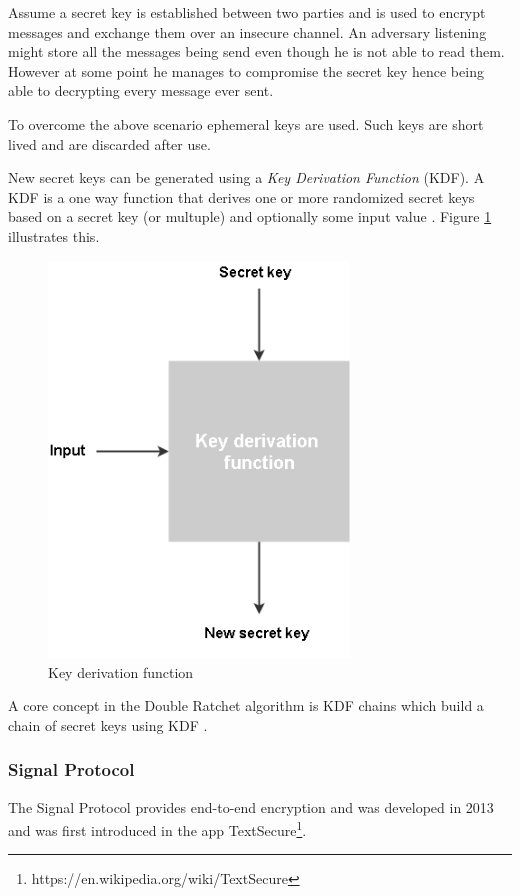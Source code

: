 Assume a secret key is established between two parties and is used to encrypt messages and exchange them over an insecure channel. An adversary listening might store all the messages being send even though he is not able to read them. However at some point he manages to compromise the secret key hence being able to decrypting every message ever sent.

To overcome the above scenario ephemeral keys are used. Such keys are short lived and are discarded after use.   

New secret keys can be generated using a \emph{Key Derivation Function} (KDF).
A KDF is a one way function that derives one or more randomized secret keys based on a secret key (or multuple) and optionally some input value \cite{crypto101}. Figure \ref{fig:kdf} illustrates this.

\begin{figure}[H] 
	\centering
	\includegraphics[width=8cm]{figures/kdf.png}
	\caption{Key derivation function}
	\label{fig:kdf}
\end{figure}


A core concept in the Double Ratchet algorithm is KDF chains which build a chain of secret keys using KDF \cite{doubleratchet}. 


\subsubsection{Signal Protocol}

The Signal Protocol provides end-to-end encryption and was developed in 2013 and was first introduced in the app TextSecure\footnote{https://en.wikipedia.org/wiki/TextSecure}.

